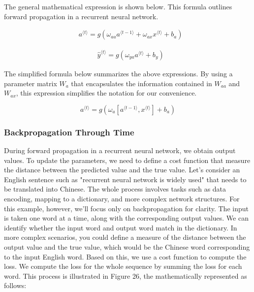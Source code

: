 \documentclass{article}
\begin{document}
The general mathematical expression is shown below. This formula outlines forward propagation in a recurrent neural network.


\begin{equation}
\begin{aligned} & a^{\langle t\rangle}=g\left(\omega_{a a} a^{\langle t-1\rangle}+\omega_{a x} x^{\langle t\rangle}+b_a\right) \end{aligned}
\end{equation}

\begin{equation}
\begin{aligned} & \hat{y}^{\langle t\rangle}=g\left(\omega_{ya} a^{\langle t\rangle}+b_y\right)\end{aligned}
\end{equation}

The simplified formula below summarizes the above expressions. By using a parameter matrix $W_a$ that encapsulates the information contained in $W_{aa}$ and $W_{ax}$, this expression simplifies the notation for our convenience.

\hspace*{\fill}

\begin{equation}
a^{\langle t\rangle}=g\left(\omega_a\left[a^{\langle t-1\rangle}, x^{\langle t\rangle}\right] +b_a\right)
\end{equation}

\newpage
\subsubsection{Backpropagation Through Time}

During forward propagation in a recurrent neural network, we obtain output values. To update the parameters, we need to define a cost function that measure the distance between the predicted value and the true value. Let's consider an English sentence such as "recurrent neural network is widely used" that needs to be translated into Chinese. The whole process involves tasks such as data encoding, mapping to a dictionary, and more complex network structures. For this example, however, we'll focus only on backpropagation for clarity. The input is taken one word at a time, along with the corresponding output values.  We can identify whether the input word and output word match in the dictionary. In more complex scenarios, you could define a measure of the distance between the output value and the true value, which would be the Chinese word corresponding to the input English word. Based on this, we use a cost function to compute the loss. We compute the loss for the whole sequence by summing the loss for each word. This process is illustrated in Figure 26, the mathematically represented as follows:
\end{document}
